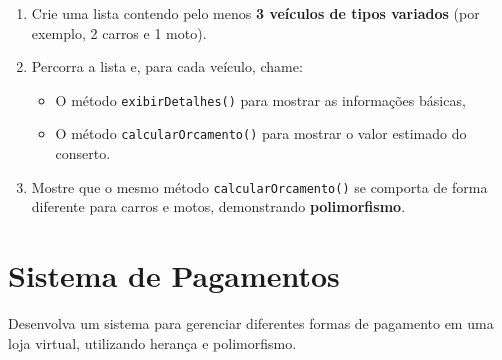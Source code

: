 \documentclass{article}
\begin{document}
\begin{enumerate}
    \item Crie uma lista contendo pelo menos \textbf{3 veículos de tipos variados} (por exemplo, 2 carros e 1 moto).

    \item Percorra a lista e, para cada veículo, chame:
    \begin{itemize}
        \item O método \texttt{exibirDetalhes()} para mostrar as informações básicas,
        \item O método \texttt{calcularOrcamento()} para mostrar o valor estimado do conserto.
    \end{itemize}

    \item Mostre que o mesmo método \texttt{calcularOrcamento()} se comporta de forma diferente para carros e motos, demonstrando \textbf{polimorfismo}.
\end{enumerate}

\section{Sistema de Pagamentos}

Desenvolva um sistema para gerenciar diferentes formas de pagamento em uma loja virtual, utilizando herança e polimorfismo.
\end{document}
